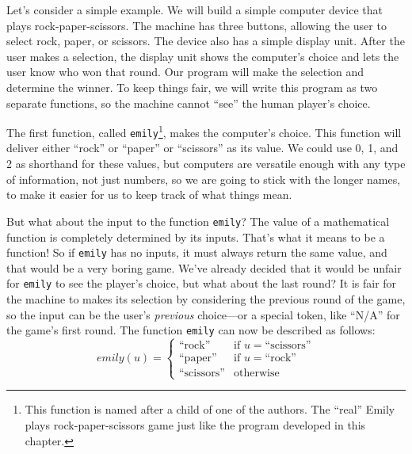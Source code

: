 Let's consider a simple example.  We will build a
simple computer device that plays rock-paper-scissors.  The machine
has three buttons, allowing the user to select rock, paper, or
scissors.  The device also has a simple display unit.  After the user
makes a selection, the display unit shows the computer's choice and
lets the user know who won that round.  Our program will make the
selection and determine the winner.  To keep things fair, we will
write this program as two separate functions, so the machine cannot 
``see'' the human player's choice.

The first function, called \texttt{emily}\footnote{This function is
named after a child of one of the authors.  The ``real'' Emily
plays rock-paper-scissors game just like the program developed in this
chapter.}, makes the computer's choice.  This function will deliver
either ``rock'' or ``paper'' or ``scissors'' as its value.
We could use 0, 1, and 2 as shorthand for these values,
but computers are versatile enough
with any type of information, not just numbers, so we are going to stick with the longer names, to make it easier for us to keep track of what things mean.

But what about the input to the function \texttt{emily}?  The value of a mathematical function is completely determined by
its inputs.  That's what it means to be a function! So if
\texttt{emily} has no inputs, it must always return the same value,
and that would be a very boring game.  We've already decided that it
would be unfair for \texttt{emily} to see the player's choice,
but what about the last round?  It is fair for the machine to makes its selection by considering the previous round of the game, so the input can be the user's
\emph{previous} choice---or a special token, like ``N/A'' for the
game's first round.  The function \texttt{emily} can now be described
as follows:
\begin{displaymath}
emily(u) =
   \left\{
        \begin{array}{ll}
        \mbox{``rock''}     & \mbox{if } u = \mbox{``scissors''} \\
        \mbox{``paper''}    & \mbox{if } u = \mbox{``rock''} \\
        \mbox{``scissors''} & \mbox{otherwise}
        \end{array}
   \right.
\end{displaymath}

